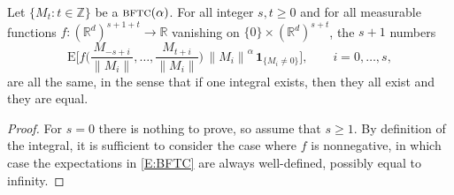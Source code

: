\documentclass{aptpubarxiv}
\numberwithin{equation}{section}
\begin{document}
\begin{prop}
\label{P:BFTC}
Let $\{M_t:t \in {\mathbb{Z}}\}$ be a ${\mbox{\sc bftc}}(\alpha)$. For all integer $s, t \ge 0$ and for all measurable functions $f : ({\mathbb{R}}^d)^{s+1+t} \to {\mathbb{R}}$ vanishing on $\{ 0 \} \times ({\mathbb{R}}^d)^{s+t}$, the $s+1$ numbers
\begin{equation}
\label{E:BFTC}
  {\mathrm{E}} \biggl[ f \biggl( \frac{M_{-s+i}}{{\|{M_i}\|}}, \ldots, \frac{M_{t+i}}{{\|{M_i}\|}} \biggr) \, {\|{M_i}\|}^\alpha \, {\boldsymbol{1}}_{ \{ M_i \ne 0 \} } \biggr], \qquad
  i = 0, \ldots, s,
\end{equation}
are all the same, in the sense that if one integral exists, then they all exist and they are equal.
\end{prop} 
\begin{proof}
For $s = 0$ there is nothing to prove, so assume that $s \ge 1$. By definition of the integral, it is sufficient to consider the case where $f$ is nonnegative, in which case the expectations in \eqref{E:BFTC} are always well-defined, possibly equal to infinity.


\end{proof}
\end{document}
